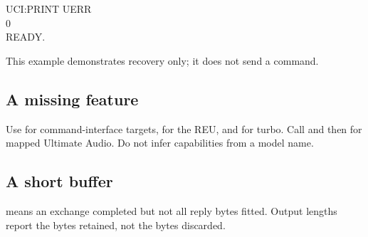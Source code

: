 \begin{screen}
UCI:PRINT UERR\\
0\\
READY.
\end{screen}

This example demonstrates recovery only; it does not send a command.

\subsection*{A missing feature}

Use  for command-interface targets,
 for the REU, and
 for turbo. Call
 and then
 for mapped Ultimate Audio. Do not infer
capabilities from a model name.

\subsection*{A short buffer}

 means an exchange completed but not all reply
bytes fitted. Output lengths report the bytes retained, not the bytes discarded.

